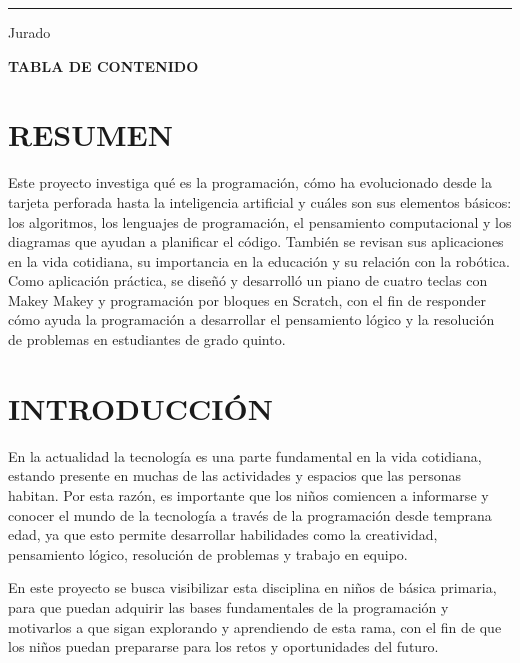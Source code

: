 \documentclass[12pt,letterpaper]{article}
\begin{document}
\noindent\rule{8cm}{0.4pt}\par
\noindent Jurado\par
\doublespacing

\clearpage
\begin{center}\large\bfseries TABLA DE CONTENIDO\end{center}
\singlespacing
\renewcommand{\contentsname}{}
{\let\clearpage\relax\tableofcontents}
\doublespacing

\section{RESUMEN}
\noindent Este proyecto investiga qué es la programación, cómo ha evolucionado desde la tarjeta perforada hasta la inteligencia artificial y cuáles son sus elementos básicos: los algoritmos, los lenguajes de programación, el pensamiento computacional y los diagramas que ayudan a planificar el código. También se revisan sus aplicaciones en la vida cotidiana, su importancia en la educación y su relación con la robótica. Como aplicación práctica, se diseñó y desarrolló un piano de cuatro teclas con Makey Makey y programación por bloques en Scratch, con el fin de responder cómo ayuda la programación a desarrollar el pensamiento lógico y la resolución de problemas en estudiantes de grado quinto.

\section{INTRODUCCIÓN}
En la actualidad la tecnología es una parte fundamental en la vida cotidiana, estando presente en muchas de las actividades y espacios que las personas habitan. Por esta razón, es importante que los niños comiencen a informarse y conocer el mundo de la tecnología a través de la programación desde temprana edad, ya que esto permite desarrollar habilidades como la creatividad, pensamiento lógico, resolución de problemas y trabajo en equipo.

En este proyecto se busca visibilizar esta disciplina en niños de básica primaria, para que puedan adquirir las bases fundamentales de la programación y motivarlos a que sigan explorando y aprendiendo de esta rama, con el fin de que los niños puedan prepararse para los retos y oportunidades del futuro.
\end{document}
